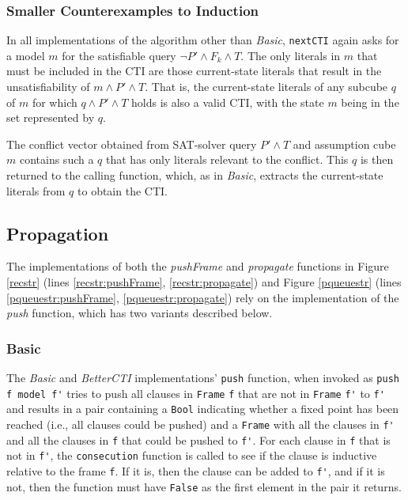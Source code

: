 \documentclass[12pt,a4paper,twoside,openright]{report}
\begin{document}
{{\subsubsection{Smaller Counterexamples to Induction}
In all implementations of the algorithm other than {\it Basic},
\verb,nextCTI, again asks for a model $m$
for the satisfiable query $\neg P' \wedge F_k \wedge T$. The only literals in $m$ that
must be included in the CTI are those current-state literals that result in
the unsatisfiability of $m \wedge P' \wedge T$. That is, the current-state literals of any
subcube $q$ of $m$ for which $q \wedge P' \wedge T$ holds is also a valid CTI, with
the state $m$ being in the set represented by $q$.

The conflict vector obtained from SAT-solver query $P' \wedge T$ and assumption
cube $m$ contains such a $q$ that has only literals relevant to the conflict. This $q$ is
then returned to the calling function, which, as in \emph{Basic}, extracts
the current-state literals from $q$ to obtain the CTI.


\subsection{Propagation}
\label{impl:propagation}
The implementations of both the {\it pushFrame} and {\it propagate} functions
in Figure \ref{recstr} (lines \ref{recstr:pushFrame},
\ref{recstr:propagate}) and
Figure \ref{pqueuestr} (lines \ref{pqueuestr:pushFrame}, \ref{pqueuestr:propagate})
rely on the implementation of the
{\it push} function, which has two variants described below.

\subsubsection{Basic}
The {\it Basic} and {\it BetterCTI} implementations' \verb,push, function,
when invoked as \verb,push f model f', tries to push all clauses in \verb,Frame, \verb,f,
that are not in \verb,Frame, \verb,f', to \verb,f', and
results in a pair containing a \verb,Bool, indicating whether a fixed point has been reached
(i.e., all clauses could be pushed) and a \verb,Frame, with all the clauses in \verb,f', and all
the clauses in \verb,f, that could be pushed to \verb,f',.
For each clause in \verb,f, that is not in \verb,f',, the \verb,consecution, function is called to
see if the clause is inductive relative to the frame \verb,f,. If it is, then
the clause can be added to \verb,f',, and if it is not, then the
function must have \verb,False, as the first element in the pair it returns.

}}
\end{document}
